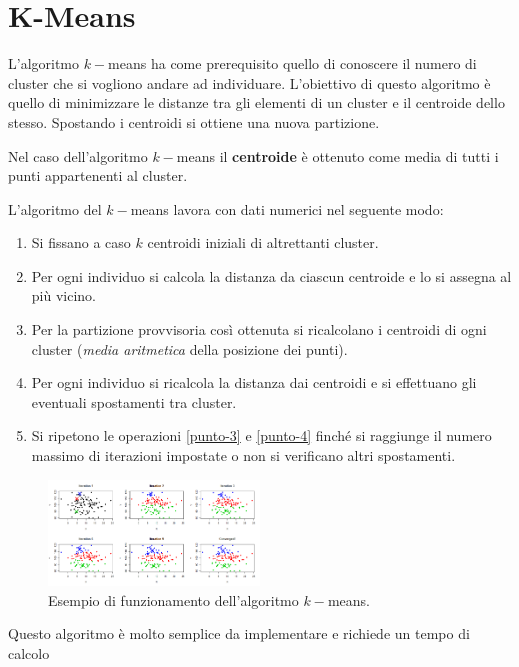 \section{K-Means}
L'algoritmo $k-$means ha come prerequisito quello di conoscere il numero di
cluster che si vogliono andare ad individuare. L'obiettivo di questo algoritmo è
quello di minimizzare le distanze tra gli elementi di un cluster e il centroide
dello stesso. Spostando i centroidi si ottiene una nuova partizione.
\begin{definizione}
      Nel caso dell'algoritmo $k-$means il \textbf{centroide} è ottenuto come
      media di tutti i punti appartenenti al cluster.
\end{definizione}
L'algoritmo del $k-$means lavora con dati numerici nel seguente modo:
\begin{enumerate}
      \item Si fissano a caso $k$ centroidi iniziali di altrettanti cluster.
      \item Per ogni individuo si calcola la distanza da ciascun centroide e lo
            si assegna al più vicino.
      \item \label{punto-3} Per la partizione provvisoria così ottenuta si
            ricalcolano i centroidi di ogni cluster (\textit{media aritmetica}
            della posizione dei punti).
      \item \label{punto-4} Per ogni individuo si ricalcola la distanza dai
            centroidi e si effettuano gli eventuali spostamenti tra cluster.
      \item Si ripetono le operazioni \ref{punto-3} e \ref{punto-4} finché si
            raggiunge il numero massimo di iterazioni impostate o non si
            verificano altri spostamenti.
\end{enumerate}
\begin{figure}[!ht]
      \centering
      \includegraphics[width = 0.5\textwidth]{img/cluster/kmeans.png}
      \caption{Esempio di funzionamento dell'algoritmo $k-$means.}
      \label{img:k-means}
\end{figure}
Questo algoritmo è molto semplice da implementare e richiede un tempo di calcolo
